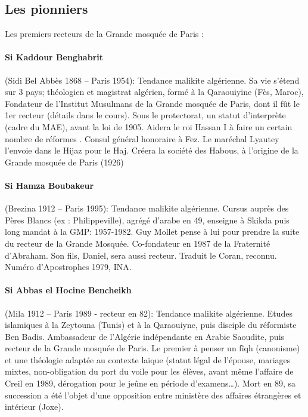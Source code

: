\subsection{Les pionniers }

Les premiers recteurs de la Grande mosquée de Paris :
\paragraph{Si Kaddour Benghabrit} (Sidi Bel Abbès 1868 – Paris 1954): Tendance malikite algérienne. Sa vie s’étend sur 3 pays; théologien et magistrat algérien, formé à la Qaraouiyine (Fès, Maroc), Fondateur de l’Institut Musulmans de la Grande mosquée de Paris, dont il fût le 1er recteur (détails dans le cours). Sous le protectorat, un statut d'interprète (cadre du MAE), avant la loi de 1905. Aidera le roi Hassan I à faire un certain nombre de réformes . Consul général honoraire à Fez. Le maréchal Lyautey l'envoie dans le Hijaz pour le Haj. Créera la société des Habous, à l'origine de la Grande mosquée de Paris (1926)

\paragraph{Si Hamza Boubakeur} (Brezina 1912 – Paris 1995): Tendance malikite algérienne. Cursus auprès des Pères Blancs (ex : Philippeville), agrégé d’arabe en 49, enseigne à Skikda puis long mandat à la GMP: 1957-1982. Guy Mollet pense à lui pour prendre la suite du recteur de la Grande Mosquée. Co-fondateur en 1987 de la Fraternité d’Abraham. Son fils, Daniel, sera aussi recteur.  Traduit le Coran, reconnu.  Numéro d'Apostrophes 1979, INA. 

\paragraph{Si Abbas el Hocine Bencheikh} (Mila 1912 – Paris 1989 - recteur en 82): Tendance malikite algérienne. Etudes islamiques à la Zeytouna (Tunis) et à la Qaraouiyne, puis disciple du réformiste Ben Badis. Ambassadeur de l’Algérie indépendante en Arabie Saoudite, puis recteur de la Grande mosquée de Paris. Le premier à penser un fîqh (canonisme) et une théologie adaptée au contexte laïque (statut légal de l’épouse, mariages mixtes, non-obligation du port du voile pour les élèves, avant même l’affaire de Creil en 1989, dérogation pour le jeûne en période d’examens…). Mort en 89, sa succession a été l'objet d'une opposition entre ministère des affaires étrangères et intérieur (Joxe).

